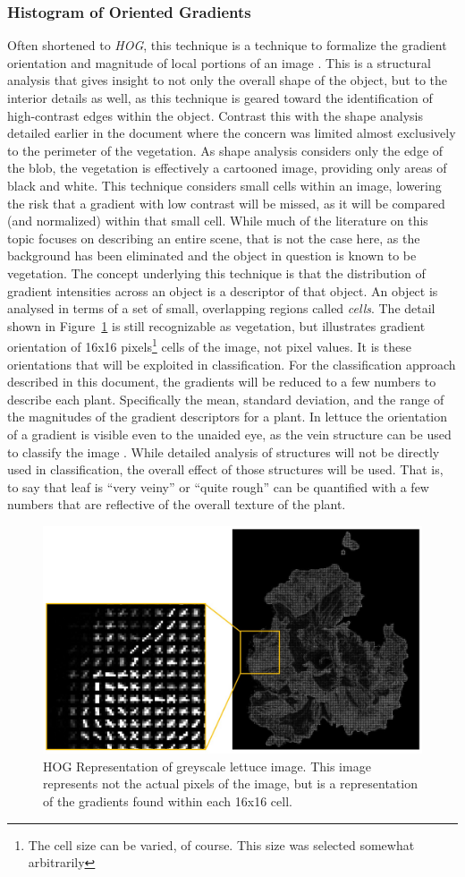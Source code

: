 \documentclass[letterpaper]{article}
\begin{document}
{\subsubsection{Histogram of Oriented Gradients}
Often shortened to \textit{HOG}, this technique is a technique to formalize the gradient orientation and magnitude of local portions of an image \parencite[p.~155]{Forsyth2012-hy}. This is a structural analysis that gives insight to not only the overall shape of the object, but to the interior details as well, as this technique is geared toward the identification of high-contrast edges within the object. Contrast this with the shape analysis detailed earlier in the document where the concern was limited almost exclusively to the perimeter of the vegetation.  As shape analysis considers only the edge of the blob, the vegetation is effectively a cartooned image, providing only areas of black and white. This technique considers small cells within an image, lowering the risk that a gradient with low contrast will be missed, as it will be compared (and normalized) within that small cell. While much of the literature on this topic focuses on describing an entire scene, that is not the case here, as the background has been eliminated and the object in question is known to be vegetation. The concept underlying this technique is that the distribution of gradient intensities across an object is a descriptor of that object. An object is analysed in terms of a set of small, overlapping regions called \textit{cells}.
The detail shown in Figure~\ref{fig:hog} is still recognizable as vegetation, but illustrates gradient orientation of 16x16 pixels\footnote{The cell size can be varied, of course. This size was selected somewhat arbitrarily} cells of the image, not pixel values. It is these orientations that will be exploited in classification.  For the classification approach described in this document, the gradients will be reduced to a few numbers to describe each plant. Specifically the mean, standard deviation, and the range of the magnitudes of the gradient descriptors for a plant. In lettuce the orientation of a gradient is visible even to the unaided eye, as the vein structure can be used to classify the image \parencite{Elhariri2014-eo}. While detailed analysis of structures will not be directly used in classification, the overall effect of those structures will be used. That is, to say that leaf is ``very veiny'' or ``quite rough'' can be quantified with a few numbers that are reflective of the overall texture of the plant.
\begin{figure}[H]
	\centering
	\includegraphics[width=0.4\linewidth]{./figures/hog.jpg}
	\caption[HOG Representation of Lettuce]{HOG Representation of greyscale lettuce image. This image represents not the actual pixels of the image, but is a representation of the gradients found within each 16x16 cell.}
	\label{fig:hog}
\end{figure}

}
\end{document}
